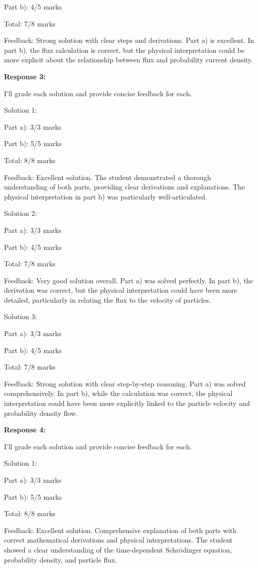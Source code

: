 \documentclass[a4paper,11pt]{article}
\begin{document}
Part b): 4/5 marks

Total: 7/8 marks

Feedback: Strong solution with clear steps and derivations. Part a) is excellent. In part b), the flux calculation is correct, but the physical interpretation could be more explicit about the relationship between flux and probability current density.

\bigskip
\textbf{Response 3:}

I'll grade each solution and provide concise feedback for each.

Solution 1:

Part a): 3/3 marks

Part b): 5/5 marks

Total: 8/8 marks

Feedback: Excellent solution. The student demonstrated a thorough understanding of both parts, providing clear derivations and explanations. The physical interpretation in part b) was particularly well-articulated.

Solution 2:

Part a): 3/3 marks

Part b): 4/5 marks

Total: 7/8 marks

Feedback: Very good solution overall. Part a) was solved perfectly. In part b), the derivation was correct, but the physical interpretation could have been more detailed, particularly in relating the flux to the velocity of particles.

Solution 3:

Part a): 3/3 marks

Part b): 4/5 marks

Total: 7/8 marks

Feedback: Strong solution with clear step-by-step reasoning. Part a) was solved comprehensively. In part b), while the calculation was correct, the physical interpretation could have been more explicitly linked to the particle velocity and probability density flow.

\bigskip   
\textbf{Response 4:}

I'll grade each solution and provide concise feedback for each.

Solution 1:

Part a): 3/3 marks

Part b): 5/5 marks

Total: 8/8 marks

Feedback: Excellent solution. Comprehensive explanation of both parts with correct mathematical derivations and physical interpretations. The student showed a clear understanding of the time-dependent Schrödinger equation, probability density, and particle flux.
\end{document}
